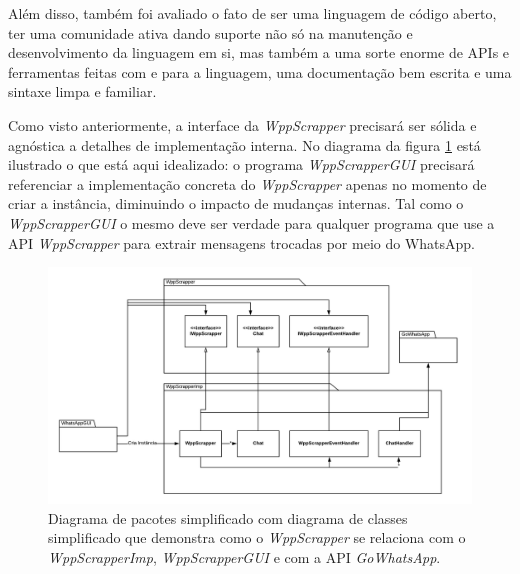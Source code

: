 Além disso, também foi avaliado o fato de ser uma linguagem de código aberto, ter uma comunidade ativa dando suporte não só na manutenção e desenvolvimento da linguagem em si, mas também a uma sorte enorme de APIs e ferramentas feitas com e para a linguagem, uma documentação bem escrita e uma sintaxe limpa e familiar. 


Como visto anteriormente, a interface da \textit{WppScrapper} precisará ser sólida e agnóstica a detalhes de implementação interna. No diagrama da figura \ref{fig:WppScrapperClass} está ilustrado o que está aqui idealizado: o programa \textit{WppScrapperGUI} precisará referenciar a implementação concreta do \textit{WppScrapper} apenas no momento de criar a instância, diminuindo o impacto de mudanças internas. Tal como o \textit{WppScrapperGUI} o mesmo deve ser verdade para qualquer programa que use a API \textit{WppScrapper} para extrair mensagens trocadas por meio do WhatsApp.

\begin{figure}[!htb]
    \includegraphics[width=\textwidth]{img/WppScrapperClass.png}
    \caption{Diagrama de pacotes simplificado com diagrama de classes simplificado que demonstra como o \textit{WppScrapper} se relaciona com o \textit{WppScrapperImp}, \textit{WppScrapperGUI} e com a API \textit{GoWhatsApp}.}
    \centering
    \label{fig:WppScrapperClass}
\end{figure}

